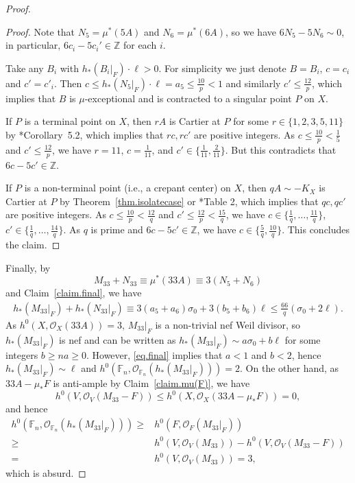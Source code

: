 \documentclass[12pt,twoside]{amsart}
\theoremstyle{definition}
\begin{document}
\begin{proof}
\begin{proof}
        Note that $N_5=\mu^*(5A)$ and $N_6=\mu^*(6A)$, so we have $6N_5-5N_6\sim 0$, in particular, $6c_i-5c_i'\in \mathbb{Z}$ for each $i$. 

        Take any $B_i$ with $h_*(B_i|_F)\cdot \ell>0$. For simplicity we just denote $B=B_i$, $c=c_i$ and $c'=c'_i$. Then $c\leq h_*(N_5|_F)\cdot \ell=a_5\leq \frac{10}{p}<1$ and similarly $c'\leq \frac{12}{p}$, which implies that $B$ is $\mu$-exceptional and is contracted to a singular point $P$ on $X$. 

        If $P$ is a terminal point on $X$, then $rA$ is Cartier at $P$ for some $r\in \{1,2,3,5,11\}$ by \cite{kawamata-crepant}*{Corollary~5.2}, which implies that $rc, rc'$ are positive integers. As $c\leq \frac{10}{p}<\frac15$ and $c'\leq \frac{12}{p}$, we have $r=11$, $c=\frac{1}{11}$, and $c'\in \{\frac{1}{11}, \frac{2}{11}\}.$ But this contradicts that $6c-5c'\in\mathbb{Z}$. 

        If $P$ is a non-terminal point (i.e., a crepant center) on $X$, then $qA\sim -K_X$ is Cartier at $P$ by Theorem~\ref{thm.isolatecase} or \cite{kawakita}*{Table 2}, which implies that $qc, qc'$ are positive integers. As $c\leq \frac{10}{p}<\frac{12}{q}$ and $c'\leq \frac{12}{p}<\frac{15}{q}$, we have $c\in\{\frac{1}{q}, \dots, \frac{11}{q}\}$, $c'\in\{\frac{1}{q}, \dots, \frac{14}{q}\}$. As $q$ is prime and $6c-5c'\in\mathbb{Z}$, we have $c\in\{\frac{5}{q}, \frac{10}{q}\}$. This concludes the claim.
    \end{proof}
 
    Finally, by 
    \[
        M_{33}+N_{33}\equiv \mu^*(33A)\equiv  3(N_5+N_6)
    \] 
    and Claim~\ref{claim.final}, we have
    \begin{align}
        h_*(M_{33}|_F)+h_*(N_{33}|_F)\equiv 3(a_5+a_6)\sigma_0+3(b_5+b_6)\ell \leq \frac{66}{q}(\sigma_0+2\ell). \label{eq.final}
    \end{align}
    As $h^0(X, \mathcal{O}_X(33A))=3$, $M_{33}|_F$ is a non-trivial nef Weil divisor, so $h_*(M_{33}|_F)$ is nef and can be written as $h_*(M_{33}|_F)\sim a\sigma_0+b\ell$ for some integers $b\geq na\geq 0$.  However, \eqref{eq.final} implies that $a<1$ and $b<2$, hence $h_*(M_{33}|_F)\sim \ell$ and $h^0(\mathbb F_n, \mathcal O_{\mathbb F_n}(h_*(M_{33}|_F)))=2$. On the other hand, as $33A-\mu_*F$ is anti-ample by Claim~\ref{claim.mu(F)}, we have
    \[
        h^0(V, \mathcal O_V(M_{33}-F))\leq h^0(X, \mathcal O_X(33A-\mu_*F))=0,
    \]
    and hence
    \begin{align*}
        h^0(\mathbb F_n, \mathcal O_{\mathbb F_n}(h_*(M_{33}|_F)))\geq {}& h^0(F, \mathcal O_F(M_{33}|_F))\\
        \geq {}& h^0(V, \mathcal O_V(M_{33}))- h^0(V, \mathcal O_V(M_{33}-F))\\
        = {}& h^0(V, \mathcal O_V(M_{33}))  = 3, 
    \end{align*}  
    which is absurd.
\end{proof}
\end{document}
